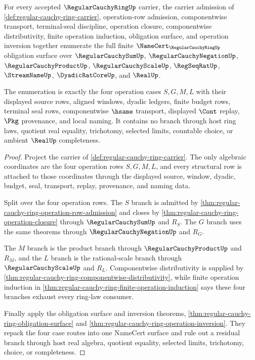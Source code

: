 \begin{theorem}
\label{thm:regular-cauchy-ring-obligation-upgrade}
For every accepted $\RegularCauchyRingUp$ carrier, the carrier admission of \autoref{def:regular-cauchy-ring-carrier}, operation-row admission, componentwise transport, terminal-seal discipline, operation closure, componentwise distributivity, finite operation induction, obligation surface, and operation inversion together enumerate the full finite $\NameCert_{\RegularCauchyRingUp}$ obligation surface over $\RegularCauchySumUp$, $\RegularCauchyNegationUp$, $\RegularCauchyProductUp$, $\RegularCauchyScaleUp$, $\RegSeqRatUp$, $\StreamNameUp$, $\DyadicRatCoreUp$, and $\RealUp$.

The enumeration is exactly the four operation cases $S,G,M,L$ with their displayed source rows, aligned windows, dyadic ledgers, finite budget rows, terminal seal rows, componentwise $\hsame$ transport, displayed $\Cont$ replay, $\Pkg$ provenance, and local naming. It contains no branch through host ring laws, quotient real equality, trichotomy, selected limits, countable choice, or ambient $\RealUp$ completeness.
\end{theorem}
\begin{proof}
Project the carrier of \autoref{def:regular-cauchy-ring-carrier}. The only algebraic coordinates are the four operation rows $S,G,M,L$, and every structural row is attached to those coordinates through the displayed source, window, dyadic, budget, seal, transport, replay, provenance, and naming data.

Split over the four operation rows. The $S$ branch is admitted by \autoref{thm:regular-cauchy-ring-operation-row-admission} and closes by \autoref{thm:regular-cauchy-ring-operation-closure} through $\RegularCauchySumUp$ and $R_S$. The $G$ branch uses the same theorems through $\RegularCauchyNegationUp$ and $R_G$.

The $M$ branch is the product branch through $\RegularCauchyProductUp$ and $R_M$, and the $L$ branch is the rational-scale branch through $\RegularCauchyScaleUp$ and $R_L$. Componentwise distributivity is supplied by \autoref{thm:regular-cauchy-ring-componentwise-distributivity}, while finite operation induction in \autoref{thm:regular-cauchy-ring-finite-operation-induction} says these four branches exhaust every ring-law consumer.

Finally apply the obligation surface and inversion theorems, \autoref{thm:regular-cauchy-ring-obligation-surface} and \autoref{thm:regular-cauchy-ring-operation-inversion}. They repack the four case routes into one NameCert surface and rule out a residual branch through host real algebra, quotient equality, selected limits, trichotomy, choice, or completeness.
\end{proof}

